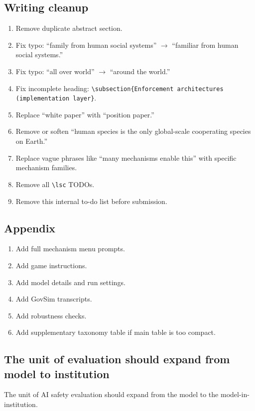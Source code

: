 \subsection*{Writing cleanup}
\begin{enumerate}
  \item[$\square$] Remove duplicate abstract section.
  \item[$\square$] Fix typo: ``family from human social systems'' $\rightarrow$ ``familiar from human social systems.''
  \item[$\square$] Fix typo: ``all over world'' $\rightarrow$ ``around the world.''
  \item[$\square$] Fix incomplete heading: \texttt{\textbackslash subsection\{Enforcement architectures (implementation layer\}}.
  \item[$\square$] Replace ``white paper'' with ``position paper.''
  \item[$\square$] Remove or soften ``human species is the only global-scale cooperating species on Earth.''
  \item[$\square$] Replace vague phrases like ``many mechanisms enable this'' with specific mechanism families.
  \item[$\square$] Remove all \texttt{\textbackslash lsc} TODOs.
  \item[$\square$] Remove this internal to-do list before submission.
\end{enumerate}

\subsection*{Appendix}
\begin{enumerate}
  \item[$\square$] Add full mechanism menu prompts.
  \item[$\square$] Add game instructions.
  \item[$\square$] Add model details and run settings.
  \item[$\square$] Add GovSim transcripts.
  \item[$\square$] Add robustness checks.
  \item[$\square$] Add supplementary taxonomy table if main table is too compact.
\end{enumerate}


\subsection{The unit of evaluation should expand from model to institution}
The unit of AI safety evaluation should expand from the model to the model-in-institution.

